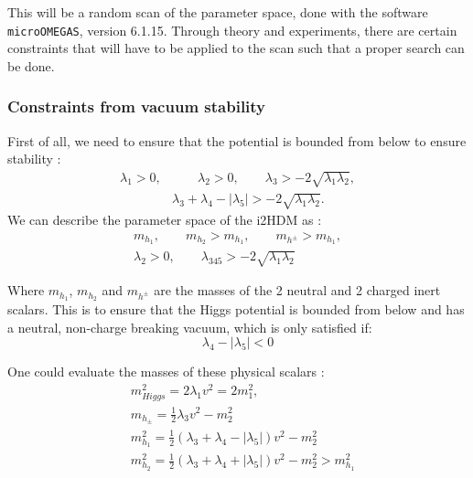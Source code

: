 \documentclass[12pt]{article}
\begin{document}
This will be a random scan of the parameter space, done with the software \verb|microOMEGAS|, version 6.1.15. Through theory and experiments, there are certain constraints that will have to be applied to the scan such that a proper search can be done.

\subsubsection{Constraints from vacuum stability}
First of all, we need to ensure that the potential is bounded from below to ensure stability \cite{Deshpande:1977rw}:
\begin{equation}
    \begin{split}
    \lambda_1>0,& \qquad
    \lambda_2>0, \qquad
    \lambda_3> -2 \sqrt{ \lambda_1 \lambda_2}, \\
    &\lambda_3 + \lambda_4 - |\lambda_5| > -2 \sqrt{ \lambda_1 \lambda_2}.
    \end{split}
    \label{eq:potential_stability}
\end{equation}
We can describe the parameter space of the i2HDM as \cite{Belyaev:2016lok}:
\begin{equation}
    \begin{split}
        m_{h_1}, \qquad m_{h_2} > m_{h_1}, \qquad m_{h^\pm} > m_{h_1}, \\
        \lambda_2 > 0, \qquad \lambda_{345} > -2\sqrt{\lambda_1 \lambda_2}
    \end{split}
\end{equation}

Where $m_{h_1}$, $m_{h_2}$ and $m_{h^\pm}$ are the masses of the 2 neutral and 2 charged inert scalars. This is to ensure that the Higgs potential is bounded from below and has a neutral, non-charge breaking vacuum, which is only satisfied if:
\begin{equation}
    \lambda_4 - |\lambda_5| < 0
\end{equation}

One could evaluate the masses of these physical scalars \cite{Belyaev:2016lok}:
\begin{align}
    \label{eqn:scalar_equations}
    &m_{Higgs}^2 = 2\lambda_1v^2 = 2m^2_1,\\
    &m_{h_\pm} = \frac{1}{2}\lambda_3v^2-m^2_2 \\
    \label{eqn:massdmscalar}
    &m_{h_1}^2 = \frac{1}{2}(\lambda_3 + \lambda_4 - |\lambda_5|)v^2 - m_2^2\\
    &m_{h_2}^2 = \frac{1}{2}(\lambda_3 + \lambda_4 + |\lambda_5|)v^2 - m_2^2 > m^2_{h_1}
\end{align}
\end{document}
